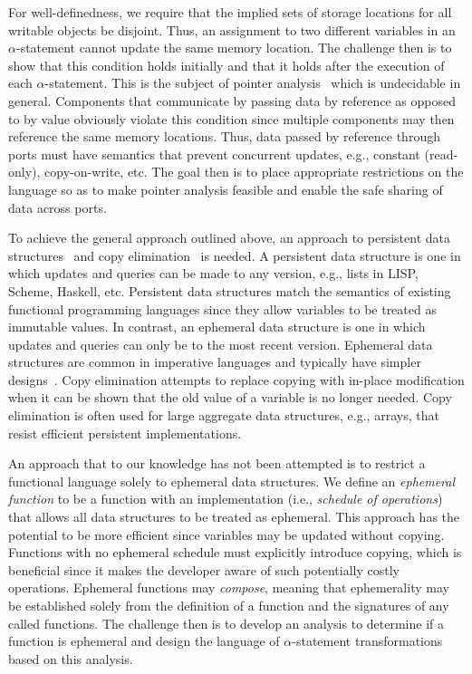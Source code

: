 For well-definedness, we require that the implied sets of storage locations for all writable objects be disjoint.
Thus, an assignment to two different variables in an $\alpha$-statement cannot update the same memory location.
The challenge then is to show that this condition holds initially and that it holds after the execution of each $\alpha$-statement.
This is the subject of pointer analysis~\cite{hind2001pointer} which is undecidable in general.
Components that communicate by passing data by reference as opposed to by value obviously violate this condition since multiple components may then reference the same memory locations.
Thus, data passed by reference through ports must have semantics that prevent concurrent updates, e.g., constant (read-only), copy-on-write, etc.
The goal then is to place appropriate restrictions on the language so as to make pointer analysis feasible and enable the safe sharing of data across ports.

To achieve the general approach outlined above, an approach to persistent data structures~\cite{driscoll1989making} and copy elimination~\cite{gopinath1989copy} is needed.
A persistent data structure is one in which updates and queries can be made to any version, e.g., lists in LISP, Scheme, Haskell, etc.
Persistent data structures match the semantics of existing functional programming languages since they allow variables to be treated as immutable values.
In contrast, an ephemeral data structure is one in which updates and queries can only be to the most recent version.
Ephemeral data structures are common in imperative languages and typically have simpler designs~\cite{okasaki1999purely}.
Copy elimination attempts to replace copying with in-place modification when it can be shown that the old value of a variable is no longer needed.
Copy elimination is often used for large aggregate data structures, e.g., arrays, that resist efficient persistent implementations.

An approach that to our knowledge has not been attempted is to restrict a functional language solely to ephemeral data structures.
We define an \emph{ephemeral function} to be a function with an implementation (i.e., \emph{schedule of operations}) that allows all data structures to be treated as ephemeral.
This approach has the potential to be more efficient since variables may be updated without copying.
Functions with no ephemeral schedule must explicitly introduce copying, which is beneficial since it makes the developer aware of such potentially costly operations.
Ephemeral functions may \emph{compose}, meaning that ephemerality may be established solely from the definition of a function and the signatures of any called functions.
The challenge then is to develop an analysis to determine if a function is ephemeral and design the language of $\alpha$-statement transformations based on this analysis.


